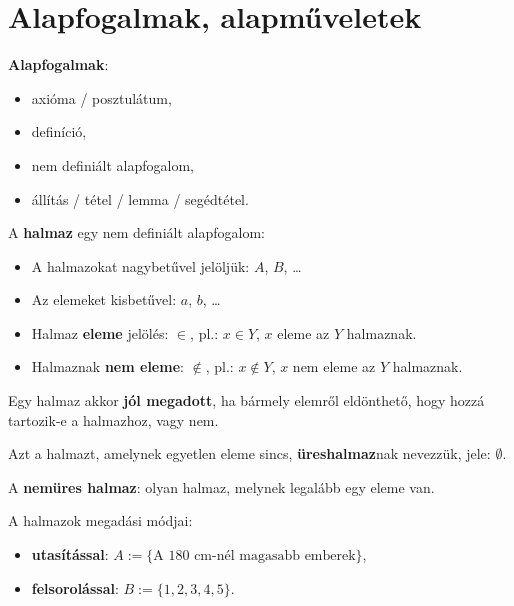 \clearpage
\section{Alapfogalmak, alapműveletek}\label{sec-01-01}

\begin{blueBox}
  \textbf{Alapfogalmak}:
  \begin{itemize}
    \item axióma / posztulátum,
    \item definíció,
    \item nem definiált alapfogalom,
    \item állítás / tétel / lemma / segédtétel.
  \end{itemize}
\end{blueBox}

\begin{blueBox}
  A \textbf{halmaz} egy nem definiált alapfogalom:
  \begin{itemize}
    \item A halmazokat nagybetűvel jelöljük: $A$, $B$, \dots
    \item Az elemeket kisbetűvel: $a$, $b$, \dots
    \item Halmaz \textbf{eleme} jelölés: $\in$, pl.: $x \in Y$, $x$ eleme az $Y$
          halmaznak.
    \item Halmaznak \textbf{nem eleme}: $\notin$, pl.: $x \notin Y$, $x$ nem
          eleme az $Y$ halmaznak.
  \end{itemize}
\end{blueBox}

\begin{note}
  Egy halmaz akkor \textbf{jól megadott}, ha bármely elemről eldönthető, hogy
  hozzá tartozik-e a halmazhoz, vagy nem.
\end{note}

\begin{definition}[Üreshalmaz]
  Azt a halmazt, amelynek egyetlen eleme sincs, \textbf{üreshalmaz}nak nevezzük,
  jele: $\emptyset$.
\end{definition}

\begin{center}
  \begin{note}
    A \textbf{nemüres halmaz}: olyan halmaz, melynek legalább egy eleme van.
  \end{note}
\end{center}

\begin{note}
  A halmazok megadási módjai:
  \begin{itemize}
    \item \textbf{utasítással}: $A := \{ \text{A 180 cm-nél magasabb emberek} \}$,
    \item \textbf{felsorolással}: $B := \{ 1, 2, 3, 4, 5 \}$.
  \end{itemize}
\end{note}

